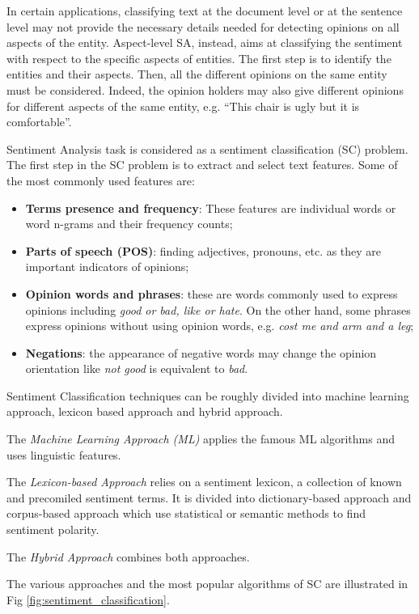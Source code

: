 In certain applications, classifying text at the document level or at the sentence level may not provide the necessary details needed for detecting opinions on all aspects of the entity. Aspect-level SA, instead, aims at classifying the sentiment with respect to the specific aspects of entities. The first step is to identify the entities and their aspects. Then, all the different opinions on the same entity must be considered. Indeed, the opinion holders may also give different opinions for different aspects of the same entity, e.g. ``This chair is ugly but it is comfortable''.

Sentiment Analysis task is considered as a sentiment classification (SC) problem. The first step in the SC problem is to extract and select text features. Some of the most commonly used features are:
\begin{itemize}
\item \textbf{Terms presence and frequency}: These features are individual words or word n-grams and their frequency counts;
\item \textbf{Parts of speech (POS)}: finding adjectives, pronouns, etc. as they are important indicators of opinions;
\item \textbf{Opinion words and phrases}: these are words commonly used to express opinions including \textit{good or bad, like or hate}. On the other hand, some phrases express opinions without using opinion words, e.g. \textit{cost me and arm and a leg};
\item \textbf{Negations}: the appearance of negative words may change the opinion orientation like \textit{not good} is equivalent to \textit{bad}. 
\end{itemize}

Sentiment Classification techniques can be roughly divided into machine learning approach, lexicon based approach and hybrid approach\cite{survey}. \par

The \textit{Machine Learning Approach (ML)} applies the famous ML algorithms and uses linguistic features. 

The \textit{Lexicon-based Approach} relies on a sentiment lexicon, a collection of known and precomiled sentiment terms. It is divided into dictionary-based approach and corpus-based approach which use statistical or semantic methods to find sentiment polarity.

The \textit{Hybrid Approach} combines both approaches. 

The various approaches and the most popular algorithms of SC are illustrated in Fig \ref{fig:sentiment_classification}. 

